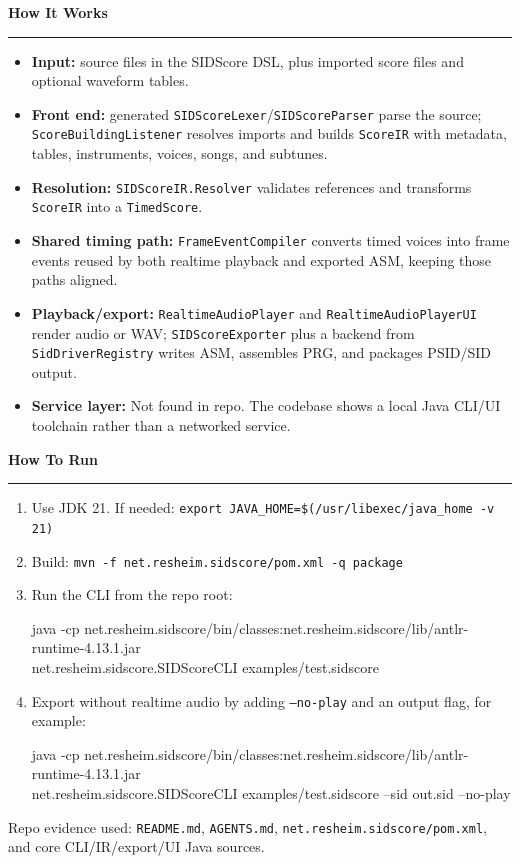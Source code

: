 \documentclass[11pt,a4paper]{article}
\newenvironment{tightitemize}
  {\begin{itemize}\setlength{\itemsep}{2pt}\setlength{\parskip}{0pt}\setlength{\parsep}{0pt}\setlength{\topsep}{2pt}}
  {\end{itemize}}
\newenvironment{tightenumerate}
  {\begin{enumerate}\setlength{\itemsep}{2pt}\setlength{\parskip}{0pt}\setlength{\parsep}{0pt}\setlength{\topsep}{2pt}}
  {\end{enumerate}}
\newcommand{\sectiontitle}[1]{%
  {\color{MidnightBlue}\large\bfseries #1\par}%
  {\color{MidnightBlue}\rule{\linewidth}{0.8pt}\par}%
  \vspace{2pt}%
}
\begin{document}
\begin{minipage}[t]{0.49\linewidth}
\sectiontitle{How It Works}
\begin{tightitemize}
\item \textbf{Input:} source files in the SIDScore DSL, plus imported score files and optional waveform tables.
\item \textbf{Front end:} generated \texttt{SIDScoreLexer}/\texttt{SIDScoreParser} parse the source; \texttt{ScoreBuildingListener} resolves imports and builds \texttt{ScoreIR} with metadata, tables, instruments, voices, songs, and subtunes.
\item \textbf{Resolution:} \texttt{SIDScoreIR.Resolver} validates references and transforms \texttt{ScoreIR} into a \texttt{TimedScore}.
\item \textbf{Shared timing path:} \texttt{FrameEventCompiler} converts timed voices into frame events reused by both realtime playback and exported ASM, keeping those paths aligned.
\item \textbf{Playback/export:} \texttt{RealtimeAudioPlayer} and \texttt{RealtimeAudioPlayerUI} render audio or WAV; \texttt{SIDScoreExporter} plus a backend from \texttt{SidDriverRegistry} writes ASM, assembles PRG, and packages PSID/SID output.
\item \textbf{Service layer:} Not found in repo. The codebase shows a local Java CLI/UI toolchain rather than a networked service.
\end{tightitemize}
\end{minipage}

\vspace{4pt}
\sectiontitle{How To Run}
\begin{tightenumerate}
\item Use JDK 21. If needed: \texttt{export JAVA\_HOME=\$(/usr/libexec/java\_home -v 21)}
\item Build: \texttt{mvn -f net.resheim.sidscore/pom.xml -q package}
\item Run the CLI from the repo root:

{\ttfamily\footnotesize
java -cp net.resheim.sidscore/bin/classes:net.resheim.sidscore/lib/antlr-runtime-4.13.1.jar\\
net.resheim.sidscore.SIDScoreCLI examples/test.sidscore\par}

\item Export without realtime audio by adding \texttt{--no-play} and an output flag, for example:

{\ttfamily\footnotesize
java -cp net.resheim.sidscore/bin/classes:net.resheim.sidscore/lib/antlr-runtime-4.13.1.jar\\
net.resheim.sidscore.SIDScoreCLI examples/test.sidscore --sid out.sid --no-play\par}
\end{tightenumerate}

\vfill
{\color{Gray}\footnotesize Repo evidence used: \texttt{README.md}, \texttt{AGENTS.md}, \texttt{net.resheim.sidscore/pom.xml}, and core CLI/IR/export/UI Java sources.}
\end{document}
